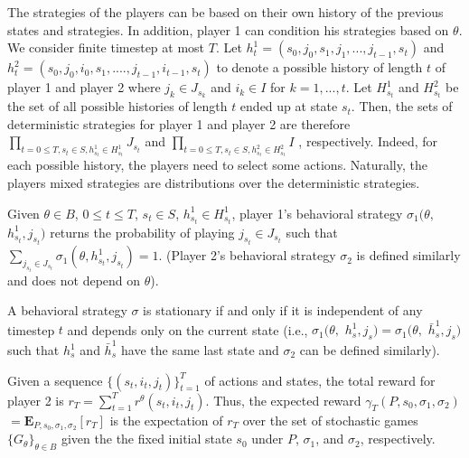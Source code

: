 The strategies of the players can be based on 
their own history of the previous states and strategies. 
In addition, player 1 can condition his strategies based 
on $\theta$. We consider finite timestep at most $T$. 
Let $h_t^1 = (s_0, j_0, s_1, j_1, ..., j_{t-1}, s_t)$ and 
$h_t^2 = (s_0, j_0, i_0, s_1, ...., j_{t-1}, i_{t-1}, s_t)$ 
to denote a possible history of length $t$ of player 1 and player 2
where $j_k \in J_{s_{k}}$ and $i_k \in I$ for $k=1, ..., t$. 
Let $H_{s_t}^1$ and $H_{s_t}^2$ be the set of all possible histories of length $t$ 
ended up at state $s_t$. 
Then, the sets of deterministic strategies for player 1 and player 2 are therefore 
$\prod_{t=0\le T, s_t \in S, h_{s_t}^1 \in H_{s_t}^1} J_{s_t}$ 
and $\prod_{t=0\le T, s_t \in S, h_{s_t}^2 \in H_{s_t}^2} I$ , respectively. 
Indeed, for each possible history, the players need to select some actions. 
Naturally, the players mixed strategies are distributions 
over the deterministic strategies. 

\begin{definition} \label{def:bhs}
Given $\theta \in B$, $0 \le t \le T$, $s_t \in S$,  $h_{s_t}^1 \in H_{s_t}^1$, 
player 1's behavioral strategy $\sigma_1(\theta,$ $h_{s_t}^1, j_{s_t} )$ returns the probability 
of playing  $j_{s_t} \in J_{s_t}$ such that $\sum_{j_{s_t} \in J_{s_t}} \sigma_1(\theta, h_{s_t}^1, j_{s_t} ) = 1$. 
(Player 2's behavioral strategy $\sigma_2$ is defined similarly and does not depend on $\theta$). 
\end{definition}

\begin{definition} \label{def:ss}
A behavioral strategy $\sigma$ is stationary if and only if it is independent of any timestep $t$
and  depends only on the current state 
(i.e., $\sigma_1(\theta,$ $h_{s}^1, j_{s} ) = \sigma_1(\theta,$ $\bar{h}_{s}^1, j_{s})$
such that $h_{s}^1$ and $\bar{h}_{s}^1$ have the same last state and
$\sigma_2$ can be defined similarly). 
\end{definition}

Given a sequence $\{(s_t,i_t,j_t)\}_{t=1}^T$ of actions and states, 
the total reward for player 2 is 
$r_T = \sum_{t=1}^T r^\theta(s_t,i_t,j_t)$. 
Thus, the expected reward 
$\gamma_T(P,s_0,\sigma_1,\sigma_2)$ $= \textbf{E}_{P,s_0,\sigma_1,\sigma_2}[r_T]$
is the expectation of $r_T$ over the set of stochastic games $\{G_\theta\}_{\theta \in B}$ 
given the the fixed initial state $s_0$ under 
$P$, $\sigma_1$, and $\sigma_2$, respectively. 

